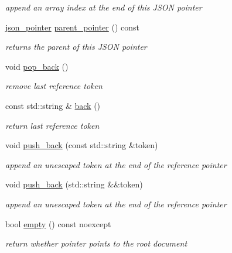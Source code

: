 \begin{DoxyCompactItemize}
\begin{DoxyCompactList}\small\item\em append an array index at the end of this J\+S\+ON pointer \end{DoxyCompactList}\item 
\hyperlink{classnlohmann_1_1json__pointer}{json\+\_\+pointer} \hyperlink{classnlohmann_1_1json__pointer_a6ae0f0aebfa875e3daf0708fcc0f59c9}{parent\+\_\+pointer} () const 
\begin{DoxyCompactList}\small\item\em returns the parent of this J\+S\+ON pointer \end{DoxyCompactList}\item 
void \hyperlink{classnlohmann_1_1json__pointer_a4b1ee4d511ca195bed896a3da47e264c}{pop\+\_\+back} ()
\begin{DoxyCompactList}\small\item\em remove last reference token \end{DoxyCompactList}\item 
const std\+::string \& \hyperlink{classnlohmann_1_1json__pointer_a6bd5b554c10f15672135c216893eef31}{back} ()
\begin{DoxyCompactList}\small\item\em return last reference token \end{DoxyCompactList}\item 
void \hyperlink{classnlohmann_1_1json__pointer_a697d12b5bd6205f8866691b166b7c7dc}{push\+\_\+back} (const std\+::string \&token)
\begin{DoxyCompactList}\small\item\em append an unescaped token at the end of the reference pointer \end{DoxyCompactList}\item 
void \hyperlink{classnlohmann_1_1json__pointer_ac228b13596d3c34185da9fe61b570194}{push\+\_\+back} (std\+::string \&\&token)
\begin{DoxyCompactList}\small\item\em append an unescaped token at the end of the reference pointer \end{DoxyCompactList}\item 
bool \hyperlink{classnlohmann_1_1json__pointer_a649252bda4a2e75a0915b11a25d8bcc3}{empty} () const noexcept
\begin{DoxyCompactList}\small\item\em return whether pointer points to the root document \end{DoxyCompactList}\end{DoxyCompactItemize}
